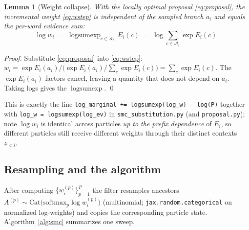 \documentclass[11pt]{article}
\newcommand{\lse}{\operatorname{logsumexp}}
\newcommand{\Cat}{\mathrm{Cat}}
\newcommand{\code}[1]{\texttt{#1}}
\newtheorem{lemma}{Lemma}
\begin{document}
\begin{lemma}[Weight collapse]\label{lem:collapse}
With the locally optimal proposal \eqref{eq:proposal}, the incremental weight \eqref{eq:wstep} is
independent of the sampled branch $a_i$ and equals the per-word evidence sum:
\begin{equation}
  \log w_i \;=\; \lse_{c\in\mathcal{A}_i}\, E_i(c)
  \;=\; \log\!\!\sum_{c\in\mathcal{A}_i}\exp E_i(c).
\end{equation}
\end{lemma}
\begin{proof}
Substitute \eqref{eq:proposal} into \eqref{eq:wstep}:
$
  w_i = \exp E_i(a_i) \big/ \big(\exp E_i(a_i)/\textstyle\sum_{c}\exp E_i(c)\big)
      = \sum_{c}\exp E_i(c).
$
The $\exp E_i(a_i)$ factors cancel, leaving a quantity that does not depend on $a_i$. Taking logs
gives the $\lse$. \qed
\end{proof}

This is exactly the line
\code{log\_marginal += logsumexp(log\_w) - log(P)} together with
\code{log\_w = logsumexp(log\_ev)} in \code{smc\_substitution.py} (and \code{proposal.py}); note
$\log w_i$ is identical across particles \emph{up to the prefix dependence} of $E_i$, so different
particles still receive different weights through their distinct contexts $z_{<i}$.

\subsection{Resampling and the algorithm}

After computing $\{w_i^{(p)}\}_{p=1}^{P}$ the filter resamples ancestors
$A^{(p)} \sim \Cat\big(\mathrm{softmax}_p \log w_i^{(p)}\big)$ (multinomial; \code{jax.random.categorical}
on normalized log-weights) and copies the corresponding particle state. Algorithm~\ref{alg:smc}
summarizes one sweep.
\end{document}
